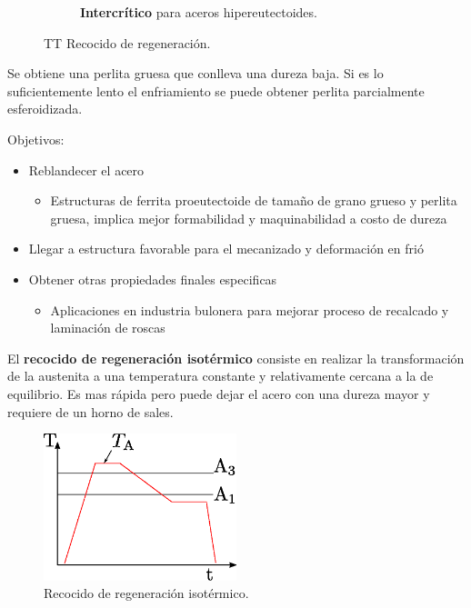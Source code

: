 \documentclass{article}
\begin{document}
\begin{figure}[htb!]
\begin{subfigure}{0.4\textwidth}
    \caption{\textbf{Intercrítico} para aceros hipereutectoides.}
    \label{fig:TTrecoreghiper}
\end{subfigure}
\caption{TT Recocido de regeneración.}
\end{figure}



Se obtiene una perlita gruesa que conlleva una dureza baja. Si es lo suficientemente lento el enfriamiento se puede obtener perlita parcialmente esferoidizada.

Objetivos:
\begin{itemize}
    \item Reblandecer el acero
    \begin{itemize}
        \item Estructuras de ferrita proeutectoide de tamaño de grano grueso y perlita gruesa, implica mejor formabilidad y maquinabilidad a costo de dureza
    \end{itemize}
    \item Llegar a estructura favorable para el mecanizado y deformación en frió
    \item Obtener otras propiedades finales especificas
    \begin{itemize}
        \item Aplicaciones en industria bulonera para mejorar proceso de recalcado y laminación de roscas
    \end{itemize}
\end{itemize}

El \textbf{recocido de regeneración isotérmico} consiste en realizar la transformación de la austenita a una temperatura constante y relativamente cercana a la de equilibrio. Es mas rápida pero puede dejar el acero con una dureza mayor y requiere de un horno de sales.

\begin{figure}[htb!]
    \centering
    \includegraphics[width=0.5\textwidth]{fig/TTrecoregiso.eps}
    \caption{Recocido de regeneración isotérmico.}
    \label{fig:TTTrecocidoregeneracionisotermico}
\end{figure}
\end{document}
